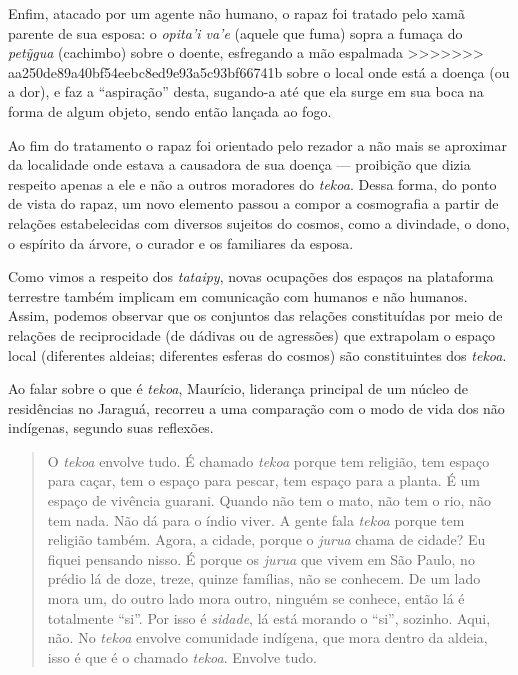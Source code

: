 {Enfim, atacado por um agente não humano, o rapaz foi tratado pelo xamã
parente de sua esposa: o \emph{opita’i va’e} (aquele que fuma) sopra a fumaça
do \emph{pet\~{y}gua} (cachimbo) sobre o doente, esfregando a mão espalmada
>>>>>>> aa250de89a40bf54eebc8ed9e93a5c93bf66741b
sobre o local onde está a doença (ou a dor), e faz a ``aspiração'' desta,
sugando-a até que ela surge em sua boca na forma de algum objeto, sendo
então lançada ao fogo. 

Ao fim do tratamento o rapaz foi orientado pelo rezador a não mais se
aproximar da localidade onde estava a causadora de sua doença ---
proibição que dizia respeito apenas a ele e não a outros moradores do
\emph{tekoa}. Dessa forma, do ponto de vista do rapaz, um novo elemento passou
a compor a cosmografia a partir de relações estabelecidas com diversos
sujeitos do cosmos, como a divindade, o dono, o espírito da árvore, o
curador e os familiares da esposa.

Como vimos a respeito dos \emph{tataipy}, novas ocupações dos espaços na
plataforma terrestre também implicam em comunicação com humanos e não
humanos. Assim, podemos observar que os conjuntos das relações
constituídas por meio de relações de reciprocidade (de dádivas ou de
agressões) que extrapolam o espaço local (diferentes aldeias;
diferentes esferas do cosmos) são constituintes dos \emph{tekoa}.

Ao falar sobre o que é \emph{tekoa}, Maurício, liderança principal de um núcleo
de residências no Jaraguá, recorreu a uma comparação com o modo de vida
dos não indígenas, segundo suas reflexões.

\begin{quote}
O \emph{tekoa} envolve tudo. É chamado \emph{tekoa} porque tem religião, tem espaço
para caçar, tem o espaço para pescar, tem espaço para a planta. É um
espaço de vivência guarani. Quando não tem o mato, não tem o rio, não
tem nada. Não dá para o índio viver. A gente fala \emph{tekoa} porque tem
religião também. Agora, a cidade, porque o \emph{jurua} chama de cidade? Eu
fiquei pensando nisso. É porque os \emph{jurua} que vivem em São Paulo, no
prédio lá de doze, treze, quinze famílias, não se conhecem. De um lado
mora um, do outro lado mora outro, ninguém se conhece, então lá é
totalmente ``si''. Por isso é \emph{sidade}, lá está morando o ``si'', sozinho.
Aqui, não. No \emph{tekoa} envolve comunidade indígena, que mora dentro da
aldeia, isso é que é o chamado \emph{tekoa}. Envolve tudo.
\end{quote}

}

